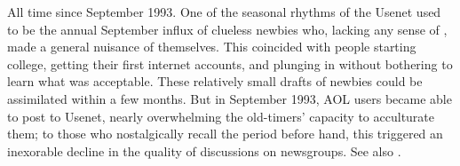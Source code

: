 
All time since September 1993. One of the seasonal rhythms of the Usenet used to be the annual September influx of clueless newbies who,
lacking any sense of , made a general nuisance of themselves. This coincided with people starting college, getting
their first internet accounts, and plunging in without bothering to learn what was acceptable. These relatively small drafts of newbies
could be assimilated within a few months. But in September 1993, AOL users became able to post to Usenet, nearly overwhelming the
old-timers' capacity to acculturate them; to those who nostalgically recall the period before hand, this triggered an inexorable decline in
the quality of discussions on newsgroups. See also .


